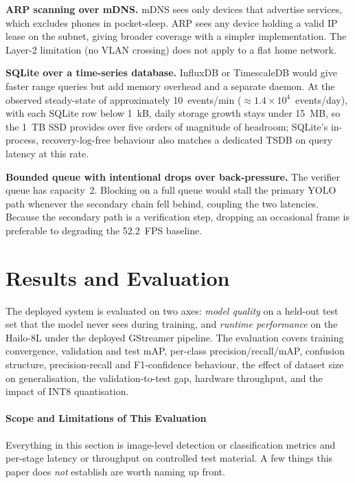 \documentclass{ieeeaccess}
\begin{document}
\textbf{ARP scanning over mDNS.} mDNS sees only devices that advertise services, which excludes phones in pocket-sleep. ARP sees any device holding a valid IP lease on the subnet, giving broader coverage with a simpler implementation. The Layer-2 limitation (no VLAN crossing) does not apply to a flat home network.

\textbf{SQLite over a time-series database.} InfluxDB or TimescaleDB would give faster range queries but add memory overhead and a separate daemon. At the observed steady-state of approximately 10~events/min ($\approx 1.4 \times 10^{4}$~events/day), with each SQLite row below 1~kB, daily storage growth stays under 15~MB, so the 1~TB SSD provides over five orders of magnitude of headroom; SQLite's in-process, recovery-log-free behaviour also matches a dedicated TSDB on query latency at this rate.

\textbf{Bounded queue with intentional drops over back-pressure.} The verifier queue has capacity~2. Blocking on a full queue would stall the primary YOLO path whenever the secondary chain fell behind, coupling the two latencies. Because the secondary path is a verification step, dropping an occasional frame is preferable to degrading the 52.2~FPS baseline.


\section{Results and Evaluation}
\label{sec:results}
The deployed system is evaluated on two axes: \textit{model quality} on a held-out test set that the model never sees during training, and \textit{runtime performance} on the Hailo-8L under the deployed GStreamer pipeline. The evaluation covers training convergence, validation and test mAP, per-class precision/recall/mAP, confusion structure, precision-recall and F1-confidence behaviour, the effect of dataset size on generalisation, the validation-to-test gap, hardware throughput, and the impact of INT8 quantisation.

\paragraph*{Scope and Limitations of This Evaluation}
Everything in this section is image-level detection or classification metrics and per-stage latency or throughput on controlled test material. A few things this paper does \emph{not} establish are worth naming up front.
\end{document}
